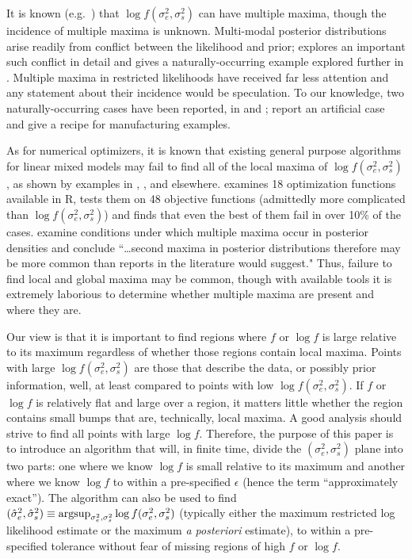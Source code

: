 \documentclass[ejs]{imsart}
\newcommand{\textcompute}{\textsf}
\newcommand{\R}{\textcompute{R}\xspace}
\newcommand{\RL}{f}
\newcommand{\logRL}{\log\RL}
\newcommand{\sigssq}{\sigma_s^2}
\newcommand{\sigesq}{\sigma_e^2}
\newcommand{\sshat}{\hat\sigma^2_e,\hat\sigma^2_s}
\newcommand{\logRLss}{\logRL(\sigesq,\sigssq)}
\newcommand{\argsup}{\operatornamewithlimits{argsup}}
\begin{document}
It is known (e.g.\ \citealt{henn&hodges:2014}) that $\logRLss$
can have multiple maxima,
though the incidence of multiple maxima is unknown.  Multi-modal posterior distributions arise readily from conflict between the likelihood and prior;  \cite{Liu&Hodges:2003} explores an important such conflict in detail and \cite{wakefield:1998} gives a naturally-occurring example explored further in \cite{henn&hodges:2014}.  Multiple maxima in restricted likelihoods have received far less attention and any statement about their incidence would be speculation.  To our knowledge, two naturally-occurring cases have been reported, in \cite{welham_thompson:2009} and \cite{reiss_etal:2014};  \cite{henn&hodges:2014} report an artificial case and give a recipe for manufacturing examples.  

As for numerical optimizers, it is known that existing general purpose algorithms for linear mixed models may fail to find all of the local maxima of $\logRLss$, as shown by examples in \cite{hodges:2013}, \cite{henn&hodges:2014}, and elsewhere.  \cite{mullen:2014} examines 18 optimization functions available in \R, tests them on 48 objective functions (admittedly more complicated than $\logRLss$) and finds that even the best of them fail in over 10\% of the cases.  \cite{henn&hodges:2014} examine conditions under which multiple maxima occur in posterior densities and conclude ``\dots second maxima in posterior distributions therefore may be more common than reports in the literature would suggest."  Thus, failure to find local and global maxima may be common, though with available tools it is extremely laborious to determine whether multiple maxima are present and where they are.

Our view is that it is important to find regions where $f$ or $\log f$ is large relative to its maximum regardless of whether those regions contain local maxima.  Points with large $\logRLss$ are those that describe the data, or possibly  prior information, well, at least compared to points with low $\logRLss$.  If $f$ or $\log f$ is relatively flat and large over a region, it matters little whether the region contains small bumps that are, technically, local maxima.  A good analysis should strive to find all  points with large $\logRL$.  Therefore, the purpose of this paper is to introduce an algorithm that will, in finite time, divide the $(\sigesq,\sigssq)$ plane into two parts: one where we know $\logRL$ is small relative to its maximum and another where we know $\logRL$ to within a pre-specified $\epsilon$ (hence the term ``approximately exact'').  The algorithm can also be used to find $(\sshat) \equiv \argsup_{\sigesq, \sigssq}\logRLss$  (typically either the maximum restricted log likelihood estimate or the maximum \textit{a posteriori} estimate), to within a pre-specified tolerance without fear of missing regions of high $f$ or $\logRL$.
\end{document}
